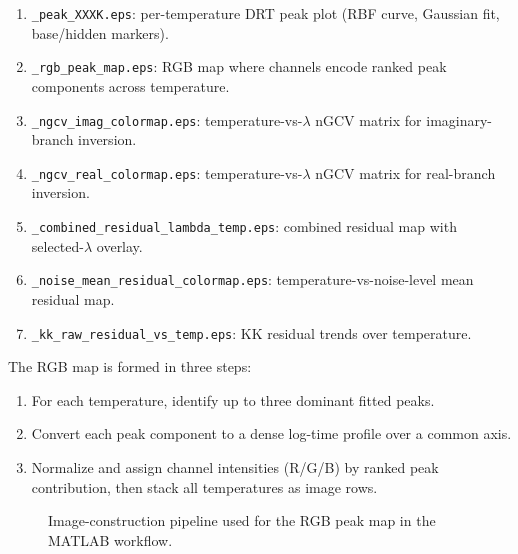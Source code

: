 \documentclass[11pt]{article}
\begin{document}
\begin{enumerate}
\item \texttt{\_peak\_XXXK.eps}: per-temperature DRT peak plot (RBF curve, Gaussian fit, base/hidden markers).
\item \texttt{\_rgb\_peak\_map.eps}: RGB map where channels encode ranked peak components across temperature.
\item \texttt{\_ngcv\_imag\_colormap.eps}: temperature-vs-$\lambda$ nGCV matrix for imaginary-branch inversion.
\item \texttt{\_ngcv\_real\_colormap.eps}: temperature-vs-$\lambda$ nGCV matrix for real-branch inversion.
\item \texttt{\_combined\_residual\_lambda\_temp.eps}: combined residual map with selected-$\lambda$ overlay.
\item \texttt{\_noise\_mean\_residual\_colormap.eps}: temperature-vs-noise-level mean residual map.
\item \texttt{\_kk\_raw\_residual\_vs\_temp.eps}: KK residual trends over temperature.
\end{enumerate}

The RGB map is formed in three steps:
\begin{enumerate}
\item For each temperature, identify up to three dominant fitted peaks.
\item Convert each peak component to a dense log-time profile over a common axis.
\item Normalize and assign channel intensities (R/G/B) by ranked peak contribution, then stack all temperatures as image rows.
\end{enumerate}

\begin{figure}[H]
\centering
{}
\caption{Image-construction pipeline used for the RGB peak map in the MATLAB workflow.}
\end{figure}
\end{document}
